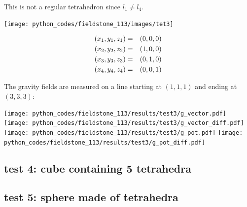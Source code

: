 This is not a regular tetrahedron since $l_{1} \neq l_4 $.

\begin{center}
\texttt{[image: python\_codes/fieldstone\_113/images/tet3]}
\end{center}


\begin{eqnarray}
(x_1,y_1,z_1) &=& (0,0,0) \nonumber\\
(x_2,y_2,z_2) &=& (1,0,0) \nonumber\\ 
(x_3,y_3,z_3) &=& (0,1,0) \nonumber\\
(x_4,y_4,z_4) &=& (0,0,1) \nonumber
\end{eqnarray}

The gravity fields are measured on a line starting at $(1,1,1)$ and ending at $(3,3,3)$:

\begin{center}
\texttt{[image: python\_codes/fieldstone\_113/results/test3/g\_vector.pdf]}
\texttt{[image: python\_codes/fieldstone\_113/results/test3/g\_vector\_diff.pdf]}\\
\texttt{[image: python\_codes/fieldstone\_113/results/test3/g\_pot.pdf]}
\texttt{[image: python\_codes/fieldstone\_113/results/test3/g\_pot\_diff.pdf]}
\end{center}


\subsection*{test 4: cube containing 5 tetrahedra}




\subsection*{test 5: sphere made of tetrahedra}








